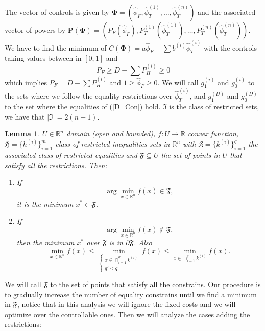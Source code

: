 \documentclass[12pt]{article}
\newtheorem{lemma}[theorem]{Lemma}
\theoremstyle{definition}
\theoremstyle{remark}
\newcommand{\R}{\mathbb{R}}
\begin{document}
The vector of controls is given by $\bm{\Phi}=(\hat{\phi}_F,\hat{\phi}_T^{(1)},\dots,\hat{\phi}_T^{(n)})$ and the associated vector of powers by $\bm{P}(\bm{\Phi})=(P_F(\hat{\phi}_F),P_T^{(1)}(\hat{\phi}_T^{(1)}),\dots,P_T^{(n)}(\hat{\phi}_T^{(n)}))$. We have to find the minimum of $C(\bm{\Phi})=a\hat{\phi}_F+\sum b^{(i)}\hat{\phi}_T^{(i)}$ with the controls taking values between in $[0,1]$ and
\begin{equation}
\overline{P}_F\geq D-\sum P_H^{(i)}\geq0
\label{D_Con}
\end{equation}
which implies $P_F=D-\sum P_H^{(i)}$ and $1\geq\hat{\phi}_F\geq0$. We will call $g_1^{(i)}$ and $g_0^{(i)}$ to the sets where we follow the equality restrictions over $\hat{\phi}_T^{(i)}$, and $g^{(D)}_1$ and $g^{(D)}_0$ to the set where the equalities of (\ref{D_Con}) hold. $\mathfrak{I}$ is the class of restricted sets, we have that $|\mathfrak{I}|=2(n+1)$.
\begin{lemma}\label{Lemma1}
$U\in\R^n$ domain (open and bounded), $f:U\to\R$ convex function, $\mathfrak{H}=\{h^{(i)}\}_{i=1}^m$ class of restricted inequalities sets in $\R^n$ with $\mathfrak{K}=\{k^{(i)}\}_{i=1}^{q}$ the associated class of restricted equalities and $\mathfrak{F}\subseteq U$ the set of points in $U$ that satisfy all the restrictions. Then:
\begin{enumerate}

\item[(i)] If
\begin{equation*}
\arg\min_{x\in\R^n}f(x)\in\mathfrak{F},
\end{equation*}
it is the minimum $x^*\in\mathfrak{F}$.

\item[(ii)] If
\begin{equation*}
\arg\min_{x\in\R^n}f(x)\notin\mathfrak{F},
\end{equation*}
then the minimum $x^*$ over $\mathfrak{F}$ is in $\partial\mathfrak{F}$. Also
\begin{equation*}
\min_{x\in\R^n}f(x)\leq\min_{\begin{cases}
x\in\cap_{i=1}^{q'}k^{(i)}\\
q'<q
\end{cases}}f(x)\leq\min_{x\in\cap_{i=1}^qk^{(i)}}f(x).
\end{equation*}

\end{enumerate}
\end{lemma}
We will call $\mathfrak{F}$ to the set of points that satisfy all the constrains. Our procedure is to gradually increase the number of equality constrains until we find a minimum in $\mathfrak{F}$, notice that in this analysis we will ignore the fixed costs and we will optimize over the controllable ones. Then we will analyze the cases adding the restrictions:
\end{document}
